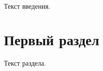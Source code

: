 \documentclass[coursework]{sfedu-mmcs-thesis}
\begin{document}
    \maketitle
    \tableofcontents
    Текст введения.
    \section{Первый раздел}
    Текст раздела.
\end{document}
